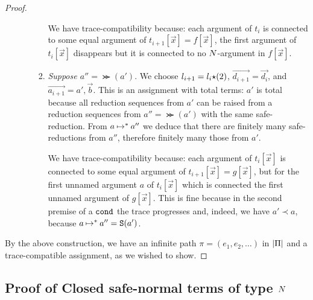 \begin{proof}
\begin{enumerate}
\begin{enumerate}
\begin{enumerate}
  We have trace-compatibility because: 
  each argument of $t_i$ is connected to some equal argument of
  $t_{i+1}[\vec{x}]=f[\vec{x}]$,
  the first argument of $t_i[\vec{x}]$ disappears   
  but it is connected to no ${N}$-argument in $f[\vec{x}]$.

 \item
  \emph{Suppose $a'' = \Succ(a')$}. 
  We choose $l_{i+1} = l_i {\star} (2)$, $\vec{d_{i+1}} = \vec{d_i}$, and
  $\vec{a_{i+1}} = a',\vec{b}$. This is an assignment with total terms: $a'$ is total because
  all reduction sequences from $a'$ can be raised from a reduction sequences from 
  $a'' = \Succ(a')$ with the same safe-reduction. From $a \mathbin{\mapsto}^{*} a''$ we deduce that
  there are finitely many safe-reductions from $a''$, therefore finitely many those from $a'$.
 
  We have trace-compatibility because: each argument of $t_i[\vec{x}]$ is connected 
  to some equal argument of $t_{i+1}[\vec{x}]=g[\vec{x}]$,
  but for the first unnamed argument $a$ of $t_i[\vec{x}]$ 
  which is connected the first unnamed argument of $g[\vec{x}]$.
  This is fine because in the second premise of a ${\tt cond}$ 
  the trace progresses and, indeed, we have $a' \prec a$, 
  because $a \mathbin{\mapsto}^{*}  a'' = {\tt S}(a')$.
  \end{enumerate}
 \end{enumerate}
\end{enumerate}

By the above construction, we have an infinite path $\pi = (e_1,e_2,\ldots)$ in ${|\Pi|}$
and a trace-compatible assignment, as we wished to show.

\end{proof}

\subsection{Proof of Closed safe-normal terms of type ${N}$}

%


